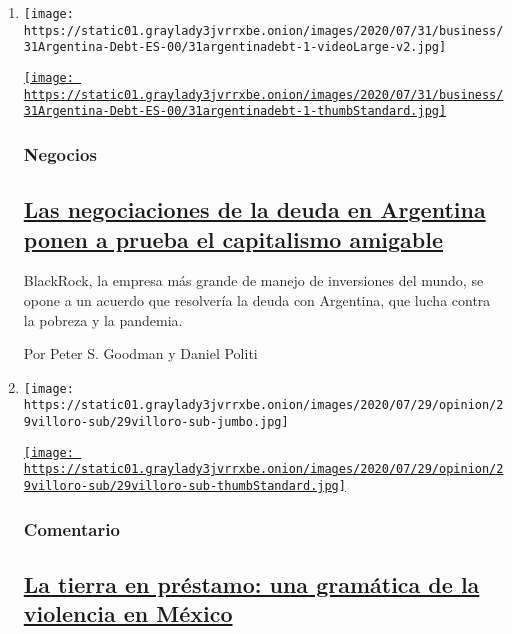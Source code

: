 \begin{enumerate}
\def\labelenumi{\arabic{enumi}.}
\item
  \texttt{[image: https://static01.graylady3jvrrxbe.onion/images/2020/07/31/business/31Argentina-Debt-ES-00/31argentinadebt-1-videoLarge-v2.jpg]}

  \href{/es/2020/07/31/espanol/negocios/argentina-deuda.html}{\texttt{[image: https://static01.graylady3jvrrxbe.onion/images/2020/07/31/business/31Argentina-Debt-ES-00/31argentinadebt-1-thumbStandard.jpg]}}

  \hypertarget{negocios}{%
  \subsubsection{Negocios}\label{negocios}}

  \hypertarget{las-negociaciones-de-la-deuda-en-argentina-ponen-a-prueba-el-capitalismo-amigable}{%
  \subsection{\texorpdfstring{\href{/es/2020/07/31/espanol/negocios/argentina-deuda.html}{Las
  negociaciones de la deuda en Argentina ponen a prueba el capitalismo
  amigable}}{Las negociaciones de la deuda en Argentina ponen a prueba el capitalismo amigable}}\label{las-negociaciones-de-la-deuda-en-argentina-ponen-a-prueba-el-capitalismo-amigable}}

  BlackRock, la empresa más grande de manejo de inversiones del mundo,
  se opone a un acuerdo que resolvería la deuda con Argentina, que lucha
  contra la pobreza y la pandemia.

  Por Peter S. Goodman y Daniel Politi
\item
  \texttt{[image: https://static01.graylady3jvrrxbe.onion/images/2020/07/29/opinion/29villoro-sub/29villoro-sub-jumbo.jpg]}

  \href{/es/2020/07/30/espanol/opinion/aztecas-violencia-narco-amlo.html}{\texttt{[image: https://static01.graylady3jvrrxbe.onion/images/2020/07/29/opinion/29villoro-sub/29villoro-sub-thumbStandard.jpg]}}

  \hypertarget{comentario}{%
  \subsubsection{Comentario}\label{comentario}}

  \hypertarget{la-tierra-en-pruxe9stamo-una-gramuxe1tica-de-la-violencia-en-muxe9xico}{%
  \subsection{\texorpdfstring{\href{/es/2020/07/30/espanol/opinion/aztecas-violencia-narco-amlo.html}{La
  tierra en préstamo: una gramática de la violencia en
  México}}{La tierra en préstamo: una gramática de la violencia en México}}\label{la-tierra-en-pruxe9stamo-una-gramuxe1tica-de-la-violencia-en-muxe9xico}}


\end{enumerate}
